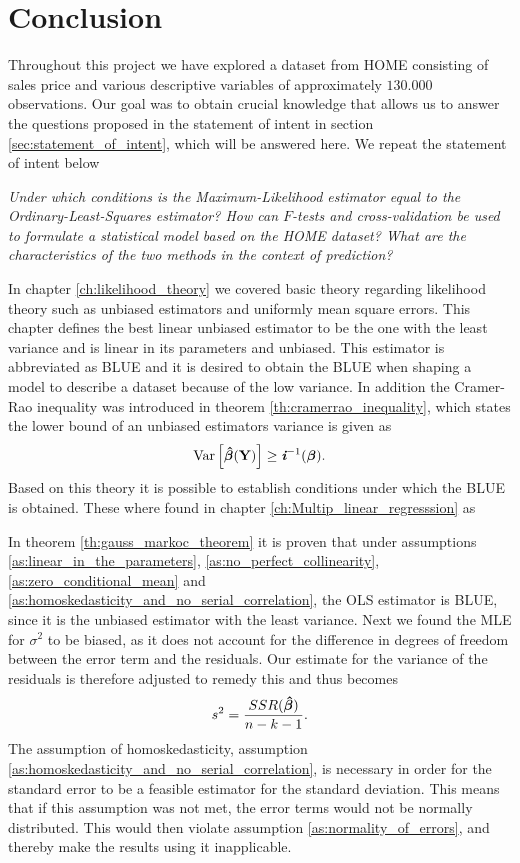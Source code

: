 \chapter{Conclusion}\label{ch:conclusion}
Throughout this project we have explored a dataset from HOME consisting of sales price and various descriptive variables of approximately $130.000$ observations. Our goal was to obtain crucial knowledge that allows us to answer the questions proposed in the statement of intent in section \ref{sec:statement_of_intent}, which will be answered here. We repeat the statement of intent below 

\textit{Under which conditions is the Maximum-Likelihood estimator equal to the Ordinary-Least-Squares estimator?
How can $F$-tests and cross-validation be used to formulate a statistical model based on the HOME dataset?
What are the characteristics of the two methods in the context of prediction?}

In chapter \ref{ch:likelihood_theory} we covered basic theory regarding likelihood theory such as unbiased estimators and uniformly mean square errors. This chapter defines the best linear unbiased estimator to be the one with the least variance and is linear in its parameters and unbiased. This estimator is abbreviated as BLUE and it is desired to obtain the BLUE when shaping a model to describe a dataset because of the low variance. 
In addition the Cramer-Rao inequality was introduced in theorem \ref{th:cramerrao_inequality}, which states the lower bound of an unbiased estimators variance is given as
\begin{align*} 
    \operatorname{\text{Var}} \Big[ \boldsymbol{\hat{\beta}}(\textbf{Y})\Big] \geq \textit{\textbf{i}}^{-1}(\boldsymbol{\beta}).
\end{align*}
Based on this theory it is possible to establish conditions under which the BLUE is obtained. These where found in chapter \ref{ch:Multip_linear_regresssion} as

In theorem \ref{th:gauss_markoc_theorem} it is proven that under assumptions \ref{as:linear_in_the_parameters}, \ref{as:no_perfect_collinearity}, \ref{as:zero_conditional_mean} and \ref{as:homoskedasticity_and_no_serial_correlation}, the OLS estimator is BLUE, since it is the unbiased estimator with the least variance.
Next we found the MLE for $\sigma^2$ to be biased, as it does not account for the difference in degrees of freedom between the error term and the residuals.
Our estimate for the variance of the residuals is therefore adjusted to remedy this and thus becomes
\begin{align*} \label{eq:sigma_hat_2_n-k-1}
    s^2 = \frac{SSR(\operatorname{\boldsymbol{\hat{\beta}}})}{n - k - 1}.
\end{align*}
The assumption of homoskedasticity, assumption \ref{as:homoskedasticity_and_no_serial_correlation}, is necessary in order for the standard error to be a feasible estimator for the standard deviation.
This means that if this assumption was not met, the error terms would not be normally distributed.
This would then violate assumption \ref{as:normality_of_errors}, and thereby make the results using it inapplicable. 


